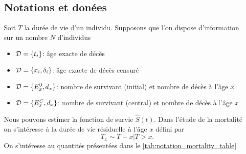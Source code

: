 \subsection{Notations et donées}\label{sssec:notation}
Soit $T$ la durée de vie d'un individu. Supposons que l'on dispose d'information sur un nombre $N$ d'individus
\begin{itemize}
  \item $\mathcal{D} = \{t_i\}$: âge exacte de décès
  \item $\mathcal{D} =\{x_i, \delta_i\}$: âge exacte de décès censuré
  \item $\mathcal{D} = \{E^0_x,d_x\}$: nombre de survivant (initial) et nombre de décès à l'âge $x$
  \item $\mathcal{D} = \{E^C_x,d_x\}$: nombre de survivant (central) et nombre de décès à l'âge $x$
\end{itemize}
Nous pouvons estimer la fonction de survie $\widehat{S}(t)$. Dans l'étude de la mortalité on s'intéresse à la durée de vie résiduelle à l'âge $x$ défini par 
$$
T_x\sim T-x|T>x.
$$
On s'intéresse au quantités présentées dans le \cref{tab:notation_mortality_table}
